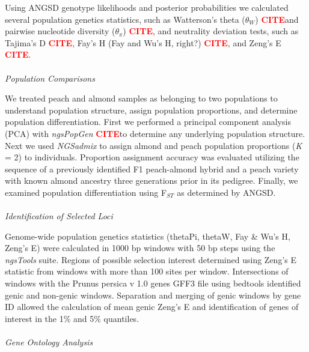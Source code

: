 \documentclass[12pt]{article}
\newcommand{\citex}{\textcolor{red}{\bf CITE}}
\begin{document}
Using ANGSD genotype likelihoods and posterior probabilities we calculated several population genetics statistics, such as Watterson's theta ($\theta_{W}$) \citex and pairwise nucleotide diversity ($\theta_{\pi}$) \citex, and neutrality deviation tests, such as Tajima's D \citex, Fay's H (Fay and Wu's H, right?) \citex, and Zeng's E \citex.
\\
%
\\
\emph{Population Comparisons}

We treated peach and almond samples as belonging to two populations to understand population structure, assign population proportions, and determine population differentiation.
%
First we performed a principal component analysis (PCA) with \emph{ngsPopGen} \citex to determine any underlying population structure.
%
Next we used \emph{NGSadmix} \citep{skotte2013estimating} to assign almond and peach population proportions (\emph{K} = 2) to individuals. 
%
Proportion assignment accuracy was evaluated utilizing the sequence of a previously identified F1 peach-almond hybrid and a peach variety with known almond ancestry three generations prior in its pedigree.
%
Finally, we examined population differentiation using F$_{ST}$ as determined by ANGSD.
%
\\
%
\\
\emph{Identification of Selected Loci}

Genome-wide population genetics statistics (thetaPi, thetaW, Fay \& Wu's H, Zeng's E) were calculated in 1000 bp windows with 50 bp steps using the \emph{ngsTools} \citep{fumagalli2014ngstools} suite.
%
Regions of possible selection interest determined using Zeng's E statistic \citep{zeng2006statistical} from windows with more than 100 sites per window.
%
Intersections of windows with the Prunus persica v 1.0 genes GFF3 file using bedtools \citep{quinlan2010bedtools} identified genic and non-genic windows.
%
Separation and merging of genic windows by gene ID allowed the calculation of mean genic Zeng's E and identification of genes of interest in the 1\% and 5\% quantiles.
\\
%
\\
\emph{Gene Ontology Analysis}
\end{document}
